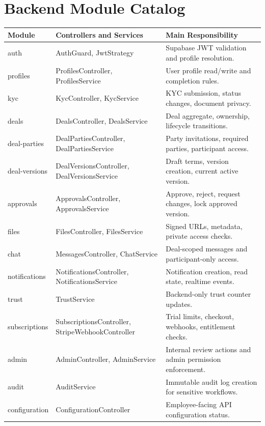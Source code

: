 \section{Backend Module Catalog}
\begin{longtable}{p{}p{}p{}}
\toprule
Module & Controllers and Services & Main Responsibility \\
\midrule
auth & AuthGuard, JwtStrategy & Supabase JWT validation and profile resolution. \\
profiles & ProfilesController, ProfilesService & User profile read/write and completion rules. \\
kyc & KycController, KycService & KYC submission, status changes, document privacy. \\
deals & DealsController, DealsService & Deal aggregate, ownership, lifecycle transitions. \\
deal-parties & DealPartiesController, DealPartiesService & Party invitations, required parties, participant access. \\
deal-versions & DealVersionsController, DealVersionsService & Draft terms, version creation, current active version. \\
approvals & ApprovalsController, ApprovalsService & Approve, reject, request changes, lock approved version. \\
files & FilesController, FilesService & Signed URLs, metadata, private access checks. \\
chat & MessagesController, ChatService & Deal-scoped messages and participant-only access. \\
notifications & NotificationsController, NotificationsService & Notification creation, read state, realtime events. \\
trust & TrustService & Backend-only trust counter updates. \\
subscriptions & SubscriptionsController, StripeWebhookController & Trial limits, checkout, webhooks, entitlement checks. \\
admin & AdminController, AdminService & Internal review actions and admin permission enforcement. \\
audit & AuditService & Immutable audit log creation for sensitive workflows. \\
configuration & ConfigurationController & Employee-facing API configuration status. \\
\bottomrule
\end{longtable}

